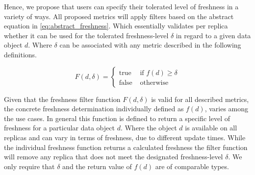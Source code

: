 Hence, we propose that users can specify their tolerated level of freshness in a variety of ways. 
All proposed metrics will apply filters based on the abstract equation in \ref{eq:abstract_freshness}. 
Which essentially validates per replica whether it can be used for the tolerated freshness-level $\delta$ in regard to a given data object $d$.
Where $\delta$ can be associated with any metric described in the following definitions.

\begin{equation} \label{eq:abstract_freshness}
    F(d, \delta)=
        \begin{cases}
            \text{true } & \text{if } f(d) \geq \delta\\
            \text{false } & \text{otherwise }
        \end{cases}
\end{equation}



Given that the freshness filter function $F(d, \delta)$ is valid for all described metrics, the concrete freshness determination individually defined as $f(d)$, 
varies among the use cases.
In general this function is defined to return a specific level of freshness for a particular data object $d$. 
Where the object $d$ is available on all replicas and can vary in terms of freshness, due to different update times.
While the individual freshness function returns a calculated freshness the filter function will remove any replica that does not meet the designated freshness-level $\delta$. 
We only require that $\delta$ and the return value of $f(d)$ are of comparable types.


